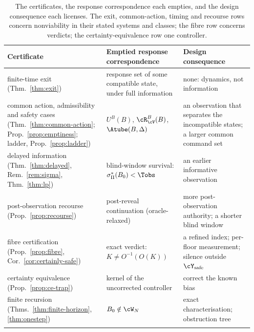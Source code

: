 \begin{table}[tb]
\centering\small\renewcommand{\arraystretch}{1.1}
\begin{tabularx}{\textwidth}{@{}>{\raggedright\arraybackslash}p{}>{\raggedright\arraybackslash}p{}X@{}}
\toprule
Certificate & Emptied response correspondence & Design consequence\\
\midrule
finite-time exit (Thm.~\ref{thm:exit}) & response set of some compatible state, under full information & none: dynamics, not information\\\addlinespace[3pt]
common action, admissibility and safety cases (Thm.~\ref{thm:common-action}; Prop.~\ref{prop:emptiness}; ladder, Prop.~\ref{prop:ladder}) & $U^B(B)$, $\cR^B_\cV(B)$, $\Atube(B,\Delta)$ & an observation that separates the incompatible states; a larger common command set\\\addlinespace[3pt]
delayed information (Thm.~\ref{thm:delayed}, Rem.~\ref{rem:sigma}, Thm.~\ref{thm:lp}) & blind-window survival: $\sigma^*_\Pi(B_0)<\Tobs$ & an earlier informative observation\\\addlinespace[3pt]
post-observation recourse (Prop.~\ref{prop:recourse}) & post-reveal continuation (oracle-relaxed) & more post-observation authority; a shorter blind window\\\addlinespace[3pt]
fibre certification (Prop.~\ref{prop:fibre}, Cor.~\ref{cor:certainly-safe}) & exact verdict: $K\ne O^{-1}(O(K))$ & a refined index; per-floor measurement; silence outside $\cY_{\mathrm{safe}}$\\\addlinespace[3pt]
certainty equivalence (Prop.~\ref{prop:ce-trap}) & kernel of the uncorrected controller & correct the known bias\\\addlinespace[3pt]
finite recursion (Thms.~\ref{thm:finite-horizon}, \ref{thm:onestep}) & $B_0\notin\cW_N$ & exact characterisation; obstruction tree\\\addlinespace[3pt]
\bottomrule
\end{tabularx}
\caption{The certificates, the response correspondence each empties, and the design consequence each licenses. The exit, common-action, timing and recourse rows concern nonviability in their stated systems and classes; the fibre row concerns verdicts; the certainty-equivalence row one controller.}
\label{tab:summary}
\end{table}

